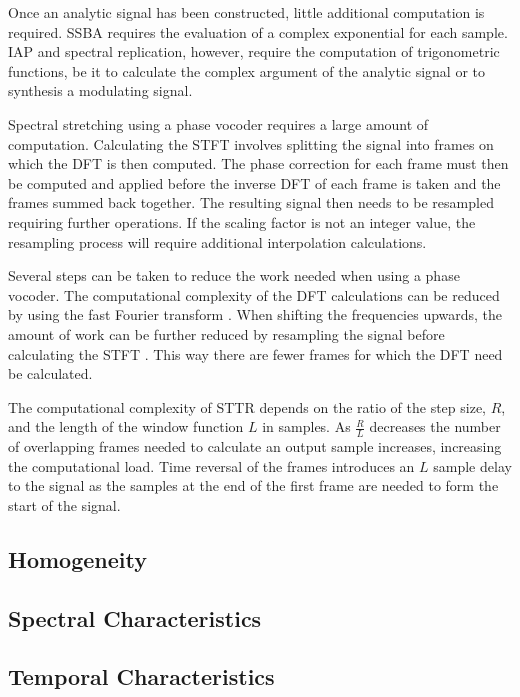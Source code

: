 		Once an analytic signal has been constructed, little additional computation is required. SSBA requires the
		evaluation of a complex exponential for each sample. IAP and spectral replication, however, require the
		computation of trigonometric functions, be it to calculate the complex argument of the analytic signal or to
		synthesis a modulating signal.

		Spectral stretching using a phase vocoder requires a large amount of computation. Calculating the STFT
		involves splitting the signal into frames on which the DFT is then computed. The phase correction for each
		frame must then be computed and applied before the inverse DFT of each frame is taken and the frames summed
		back together. The resulting signal then needs to be resampled requiring further operations. If the scaling
		factor is not an integer value, the resampling process will require additional interpolation calculations.
	
		Several steps can be taken to reduce the work needed when using a phase vocoder. The computational
		complexity of the DFT calculations can be reduced by using the fast Fourier transform
		\citep{portnoff1976implementation}. When shifting the frequencies upwards, the amount of work can be further
		reduced by resampling the signal before calculating the STFT \citep{laroche1999new}. This way there are
		fewer frames for which the DFT need be calculated.

		The computational complexity of STTR depends on the ratio of the step size, $R$, and the length of the
		window function $L$ in samples. As $\frac{R}{L}$ decreases the number of overlapping frames needed to
		calculate an output sample increases, increasing the computational load. Time reversal of the frames
		introduces an $L$ sample delay to the signal as the samples at the end of the first frame are needed to form
		the start of the signal.

	\subsection{Homogeneity}
	\label{sec:ExcitationEvaluation-Comparison-Homogeneity}

	\subsection{Spectral Characteristics}
	\label{sec:ExcitationEvaluation-Comparison-SpectralCharacteristics}

	\subsection{Temporal Characteristics}
	\label{sec:ExcitationEvaluation-Comparison-TemporalCharacteristics}


